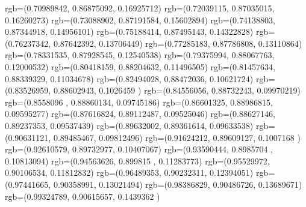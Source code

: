 {{{			rgb=(0.70989842,  0.86875092,  0.16925712)
			rgb=(0.72039115,  0.87035015,  0.16260273)
			rgb=(0.73088902,  0.87191584,  0.15602894)
			rgb=(0.74138803,  0.87344918,  0.14956101)
			rgb=(0.75188414,  0.87495143,  0.14322828)
			rgb=(0.76237342,  0.87642392,  0.13706449)
			rgb=(0.77285183,  0.87786808,  0.13110864)
			rgb=(0.78331535,  0.87928545,  0.12540538)
			rgb=(0.79375994,  0.88067763,  0.12000532)
			rgb=(0.80418159,  0.88204632,  0.11496505)
			rgb=(0.81457634,  0.88339329,  0.11034678)
			rgb=(0.82494028,  0.88472036,  0.10621724)
			rgb=(0.83526959,  0.88602943,  0.1026459 )
			rgb=(0.84556056,  0.88732243,  0.09970219)
			rgb=(0.8558096 ,  0.88860134,  0.09745186)
			rgb=(0.86601325,  0.88986815,  0.09595277)
			rgb=(0.87616824,  0.89112487,  0.09525046)
			rgb=(0.88627146,  0.89237353,  0.09537439)
			rgb=(0.89632002,  0.89361614,  0.09633538)
			rgb=(0.90631121,  0.89485467,  0.09812496)
			rgb=(0.91624212,  0.89609127,  0.1007168 )
			rgb=(0.92610579,  0.89732977,  0.10407067)
			rgb=(0.93590444,  0.8985704 ,  0.10813094)
			rgb=(0.94563626,  0.899815  ,  0.11283773)
			rgb=(0.95529972,  0.90106534,  0.11812832)
			rgb=(0.96489353,  0.90232311,  0.12394051)
			rgb=(0.97441665,  0.90358991,  0.13021494)
			rgb=(0.98386829,  0.90486726,  0.13689671)
			rgb=(0.99324789,  0.90615657,  0.1439362 )
		}
	}
}


\usepackage{braket}
\usepackage{amsmath}
\usepackage[thinc]{esdiff}

\usepackage{graphicx, color}
\usepackage{subcaption}
\usepackage{tikz}
\usetikzlibrary{arrows}
\usetikzlibrary{calc}
\usepackage{wasysym}
\usepackage{gensymb}
\usepackage[toc]{appendix}
\usepackage{intcalc}



\iffalse
\definecolor{rainbow1of8}{RGB}{230,25,75}
\definecolor{rainbow2of8}{RGB}{245,130,48}
\definecolor{rainbow3of8}{RGB}{255,255,25}
\definecolor{rainbow4of8}{RGB}{210,245,60}
\definecolor{rainbow5of8}{RGB}{60,180,75}
\definecolor{rainbow6of8}{RGB}{70,240,240}
\definecolor{rainbow7of8}{RGB}{0,130,200}
\definecolor{rainbow8of8}{RGB}{145,30,180}
\fi

